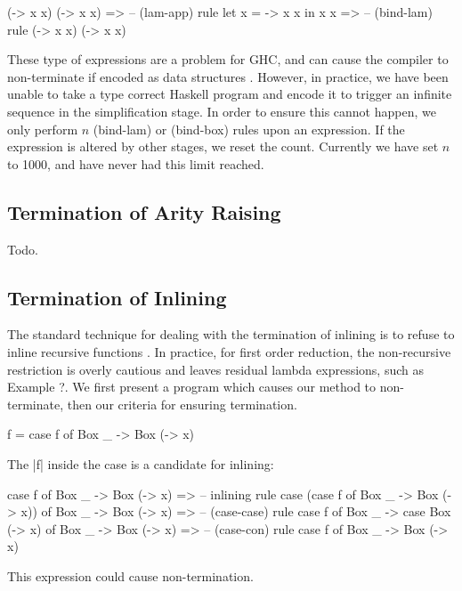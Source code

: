 \documentclass[preprint]{sigplanconf}
\begin{document}
\begin{code}
(\x -> x x) (\x -> x x)
   => -- (lam-app) rule
let x = \x -> x x in x x
   => -- (bind-lam) rule
(\x -> x x) (\x -> x x)
\end{code}

These type of expressions are a problem for GHC, and can cause the compiler to non-terminate if encoded as data structures \cite{spj:simplifier}. However, in practice, we have been unable to take a type correct Haskell program and encode it to trigger an infinite sequence in the simplification stage. In order to ensure this cannot happen, we only perform $n$ (bind-lam) or (bind-box) rules upon an expression. If the expression is altered by other stages, we reset the count. Currently we have set $n$ to 1000, and have never had this limit reached.

\subsection{Termination of Arity Raising}

Todo.

\subsection{Termination of Inlining}

The standard technique for dealing with the termination of inlining is to refuse to inline recursive functions \cite{spj:inlining}. In practice, for first order reduction, the non-recursive restriction is overly cautious and leaves residual lambda expressions, such as Example ?. We first present a program which causes our method to non-terminate, then our criteria for ensuring termination.

\begin{example}
\begin{code}
f = case  f of
          Box _ -> Box (\x -> x)
\end{code}

The |f| inside the case is a candidate for inlining:

\begin{code}
case f of Box _ -> Box (\x -> x)
    => -- inlining rule
case (case f of Box _ -> Box (\x -> x)) of Box _ -> Box (\x -> x)
    => -- (case-case) rule
case f of Box _ -> case Box (\x -> x) of Box _ -> Box (\x -> x)
    => -- (case-con) rule
case f of Box _ -> Box (\x -> x)
\end{code}

This expression could cause non-termination.
\end{example}
\end{document}
